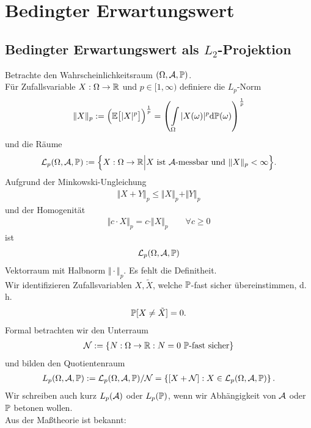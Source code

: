 
\chapter{Bedingter Erwartungswert}
\section{Bedingter Erwartungswert als \texorpdfstring{$L_2$}{L\_2}-Projektion}
Betrachte den Wahrscheinlichkeitsraum $(\Omega,\A,\P)$.\\
Für Zufallsvariable $X:\Omega\to\R$ und $p\in[1,\infty)$ definiere die $L_p$-Norm
\begin{align*}
	\Vert X\Vert_p
	:=\Big(\E\big[|X|^p\big]\Big)^{\frac{1}{p}}
	=\left(\int\limits_\Omega|X(\omega)|^p\d\P(\omega)\right)^{\frac{1}{p}}
\end{align*}
und die Räume
\begin{align*}
	\mathcal{L}_p(\Omega,\A,\P):=\Big\lbrace X:\Omega\to\R\Big|X\text{ ist $\A$-messbar und }\Vert X\Vert_p<\infty\Big\rbrace.
\end{align*}
Aufgrund der Minkowski-Ungleichung
\begin{align*}
	\Vert X+Y\Vert_p\leq\Vert X\Vert_p+\Vert Y\Vert_p
\end{align*}
und der Homogenität
\begin{align*}
	\Vert c\cdot X\Vert_p=c\cdot\Vert X\Vert_p\qquad\forall c\geq0
\end{align*}
ist 
\begin{align*}
	\mathcal{L}_p(\Omega,\A,\P)
\end{align*}
Vektorraum mit Halbnorm $\Vert\cdot\Vert_p$. Es fehlt die Definitheit.\\
Wir identifizieren Zufallsvariablen $X,\tilde{X}$, welche $\P$-fast sicher übereinstimmen, d. h. 
\begin{align*}
	\P[X\neq\tilde{X}]=0.
\end{align*}
Formal betrachten wir den Unterraum
\begin{align*}
	\mathcal{N}:=\lbrace N:\Omega\to\R:N=0\text{ $\P$-fast sicher}\rbrace
\end{align*}
und bilden den Quotientenraum
\begin{align*}
	L_p(\Omega,\A,\P):=\mathcal{L}_p(\Omega,\A,\P)/\mathcal{N}=\left\lbrace[X+\mathcal{N}]:X\in\mathcal{L}_p(\Omega,\A,\P)\right\rbrace.
\end{align*}
Wir schreiben auch kurz $L_p(\A)$ oder $L_p(\P)$, wenn wir Abhängigkeit von $\A$ oder $\P$ betonen wollen.\\
Aus der Maßtheorie ist bekannt:

